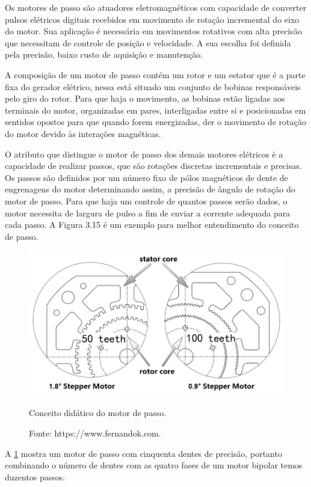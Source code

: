 Os motores de passo são atuadores eletromagnéticos com capacidade de converter pulsos elétricos digitais recebidos em 
movimento de rotação incremental do eixo do motor. Sua aplicação é necessária em movimentos rotativos com alta precisão 
que necessitam de controle de posição e velocidade. A sua escolha foi definida pela precisão, baixo custo de aquisição 
e manutenção.

A composição de um motor de passo contém um rotor e um estator que é a parte fixa do gerador elétrico, nessa está 
situado um conjunto de bobinas responsáveis pelo giro do rotor. Para que haja o movimento, as bobinas estão ligadas 
aos terminais do motor, organizadas em pares, interligadas entre si e posicionadas em sentidos opostos para que 
quando forem energizadas, der o movimento de rotação do motor devido às interações magnéticas.

O atributo que distingue o motor de passo dos demais motores elétricos é a capacidade de realizar passos, que são 
rotações discretas incrementais e precisas. Os passos são definidos por um número fixo de pólos magnéticos de dente 
de engrenagens do motor determinando assim, a precisão de ângulo de rotação do motor de passo. Para que haja um 
controle de quantos passos serão dados, o motor necessita de largura de pulso a fim de enviar a corrente adequada 
para cada passo. A Figura 3.15 é um exemplo para melhor entendimento do conceito de passo.

\begin{figure}[!htb]
\centering
\includegraphics[scale = 0.4]{figuras/3-15}
\caption{Conceito didático do motor de passo.}
\caption*{Fonte: https://www.fernandok.com.}
\label{figdidaticopasso}
\end{figure}
    
A \ref{figdidaticopasso} mostra um motor de passo com cinquenta dentes de precisão, portanto combinando 
o número de dentes com as quatro fases de um motor bipolar temos duzentos passos.

